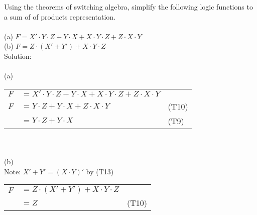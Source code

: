 Using the theorems of switching algebra, simplify the following logic functions to a sum of of products representation.\\ \\
(a) $F=X' \cdot Y \cdot Z + Y \cdot X + X \cdot Y \cdot Z + Z \cdot X \cdot Y$ \\
(b) $F=Z \cdot (X' + Y') + X \cdot Y \cdot Z$ \\

Solution: \\ \\
(a)\\
\begin{tabular}{rll}
  $F$ & $=X' \cdot Y \cdot Z + Y \cdot X + X \cdot Y \cdot Z + Z \cdot X \cdot Y$ &\\
  $F$ & $=Y \cdot Z + Y \cdot X + Z \cdot X \cdot Y$ & (T10)\\
      & $=Y \cdot Z + Y \cdot X$ & (T9)\\
\end{tabular}\\ \\
(b)\\
Note: $X' + Y' = (X \cdot Y)'$ by (T13)\\
\begin{tabular}{rll}
  $F$ & $=Z \cdot (X' + Y') + X \cdot Y \cdot Z$ &\\
      & $=Z$ & (T10)\\
\end{tabular}\\ \\
